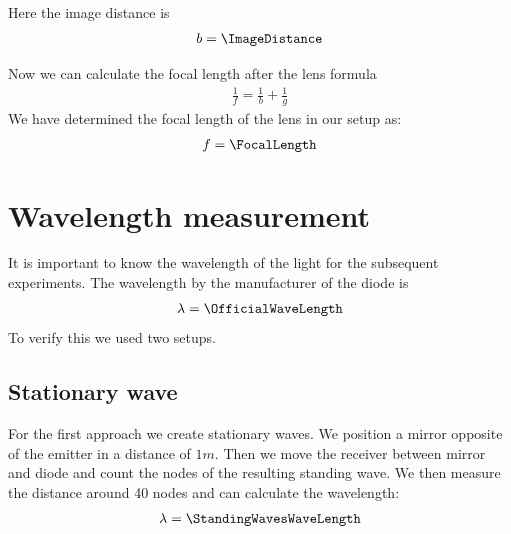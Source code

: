 \documentclass[a4paper,10pt,twocolumn]{article}
\begin{document}
    Here the image distance is 
    \begin{align*}
        b = \ImageDistance
    \end{align*}

    Now we can calculate the focal length after the lens formula
    \begin{align}
        \label{eq:LensFormula}
        \frac{1}{f} = \frac{1}{b} + \frac{1}{g}
    \end{align}
    We have determined the focal length of the lens in our setup as:
    \begin{align*}
        f = \FocalLength
    \end{align*}
    \section{Wavelength measurement}
    It is important to know the wavelength of the light for the subsequent experiments.
    The wavelength by the manufacturer of the diode is
    \begin{align*}
        \lambda = \OfficialWaveLength
    \end{align*}
    To verify this we used two setups.
    \subsection{Stationary wave}
    For the first approach we create stationary waves.
    We position a mirror opposite of the emitter in a distance of $1m$.
    Then we move the receiver between mirror and diode and count the nodes of the resulting standing wave.
    We then measure the distance around 40 nodes and can calculate the wavelength:
    \begin{align*}
        \lambda = \StandingWavesWaveLength
    \end{align*}
\end{document}
